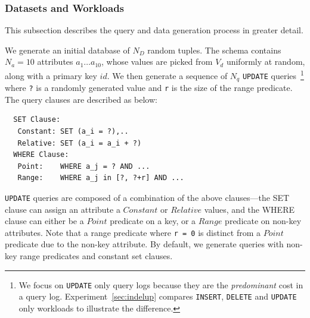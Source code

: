 \subsubsection{Datasets and Workloads}

This subsection describes the query and data generation process in greater detail.

 \label{sec:syntheticgen}
We generate an initial database of $N_D$ random tuples.  
The schema contains $N_a=10$ attributes $a_1\ldots a_{10}$, whose values are
picked from  $V_d$ uniformly at random, along with a primary key $id$.
We then generate a sequence of $N_q$ \texttt{UPDATE} queries~\footnote{\scriptsize We focus on
\texttt{UPDATE} only query logs because they are the {\it predominant} cost 
in a query log.  Experiment~\ref{sec:indelup} compares \texttt{INSERT}, \texttt{DELETE} and \texttt{UPDATE}
only workloads to illustrate the difference.} where 
\verb|?| is a randomly generated value and \verb|r| is the size of the range predicate.  
The query clauses are described as below:
{\scriptsize
\begin{verbatim}
  SET Clause:
   Constant: SET (a_i = ?),..
   Relative: SET (a_i = a_i + ?)
  WHERE Clause:
   Point:    WHERE a_j = ? AND ...
   Range:    WHERE a_j in [?, ?+r] AND ...
\end{verbatim}
}

\texttt{UPDATE} queries are composed of a combination of the above clauses---the SET clause 
can assign an attribute a $Constant$ or $Relative$ values,
and the WHERE clause can either be a $Point$ predicate on a key, or a $Range$ predicate on non-key attributes.  
Note that a range predicate where \texttt{r = 0} is distinct from a $Point$ predicate due to the non-key attribute.
By default, we generate queries with non-key range predicates and constant set clauses.

